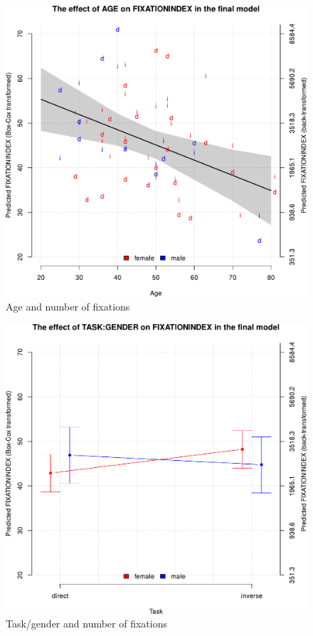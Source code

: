 \documentclass[output=paper]{langscibook}
\begin{document}
\begin{figure}
        \includegraphics[height=.45\textheight]{figures/Ferreira-Figure1.1.pdf}
        \caption{Age and number of fixations\label{fig1h}}
\end{figure}

\begin{figure}
        \includegraphics[height=.45\textheight]{figures/Ferreira-Figure1.2.pdf}
        \caption{Task/gender and number of fixations\label{fig2h}}
\end{figure}
\end{document}
